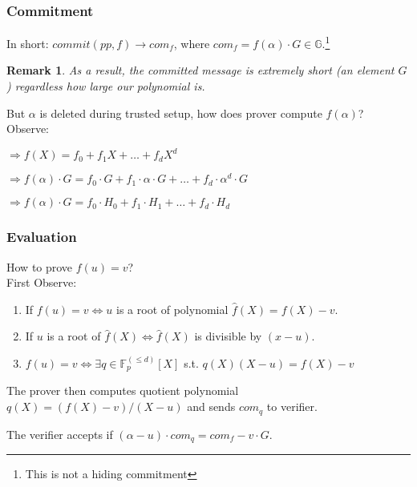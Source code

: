 \documentclass[10pt]{article}
\newtheorem*{remark*}{Remark}
\newcommand{\FFamily}{\mathbb{F}^{(\leq d)}_p[X]}
\begin{document}
\subsubsection*{Commitment}
In short: $commit(pp, f) \rightarrow com_{f}$, where $com_{f} = f(\alpha) \cdot G \in
\mathbb{G}$.\footnote{This is not a hiding commitment} \\

\begin{remark*}
    As a result, the committed message is extremely short (an
    element $G$) regardless how large our polynomial is.
\end{remark*}

But $\alpha$ is deleted during trusted setup, how does prover compute
$f(\alpha)$?\\
Observe:
\begin{description}
    \item $\Rightarrow f(X) = f_0 + f_1X + \ldots + f_dX^d $
    \item $\Rightarrow f(\alpha) \cdot G = f_0 \cdot G + f_1 \cdot \alpha \cdot G 
        + \ldots + f_d \cdot \alpha^d \cdot G $
    \item $\Rightarrow f(\alpha) \cdot G = f_0 \cdot H_0 + f_1 \cdot H_1 + \ldots + f_d
        \cdot H_d $
\end{description}

\subsubsection*{Evaluation}
How to prove $f(u) = v$?\\ 

First Observe:
\begin{enumerate}
\item If $f(u) = v \Longleftrightarrow u$ is a root of polynomial
    $\hat{f}(X) = f(X) - v$.
\item If $u$ is a root of $\hat{f}(X) \Longleftrightarrow \hat{f}(X)$  is divisible
    by $(x - u)$.
\item $f(u) = v \Longleftrightarrow \exists q \in \FFamily$ s.t. $q(X)(X-u)=f(X)-v$
    
\end{enumerate}

\begin{description}
    \item The prover then computes quotient polynomial $q(X) = (f(X) - v) / (X - u)$
        and sends $com_q$ to verifier.
    \item The verifier accepts if $(\alpha - u) \cdot com_q = com_f - v \cdot G$.
\end{description}
\end{document}
